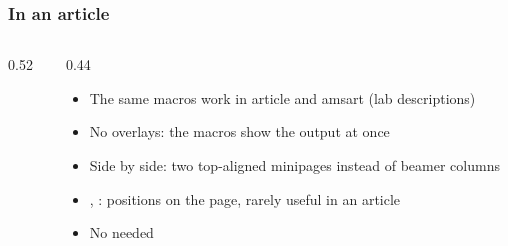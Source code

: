 \documentclass[aspectratio=169,10pt,compress]{beamer}
\begin{document}
\begin{frame}[t,fragile] \frametitle{In an article}
	\begin{columns}[T]
		\begin{column}{0.52\textwidth}


		\end{column}
		\begin{column}{0.44\textwidth}
			\begin{itemize}\small
				\item The same macros work in article and amsart (lab descriptions)
				\item No overlays: the  macros show the output at once
				\item Side by side: two top-aligned minipages instead of beamer columns
				\item {}, : positions on the page,
				rarely useful in an article
				\item No  needed
			\end{itemize}
		\end{column}
	\end{columns}
\end{frame}
\end{document}
